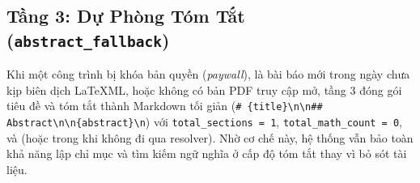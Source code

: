 \subsection{Tầng 3: Dự Phòng Tóm Tắt (\texttt{abstract\_fallback})}
\label{sec:ch2_tier3_abstract}

Khi một công trình bị khóa bản quyền (\textit{paywall}), là bài báo mới trong ngày chưa kịp biên dịch LaTeXML, hoặc không có bản PDF truy cập mở, tầng 3 đóng gói tiêu đề và tóm tắt thành Markdown tối giản (\texttt{\# \{title\}\textbackslash n\textbackslash n\#\# Abstract\textbackslash n\textbackslash n\{abstract\}\textbackslash n}) với \texttt{total\_sections = 1}, \texttt{total\_math\_count = 0}, và  (hoặc  trong  khi không đi qua resolver). Nhờ cơ chế này, hệ thống vẫn bảo toàn khả năng lập chỉ mục và tìm kiếm ngữ nghĩa ở cấp độ tóm tắt thay vì bỏ sót tài liệu.

